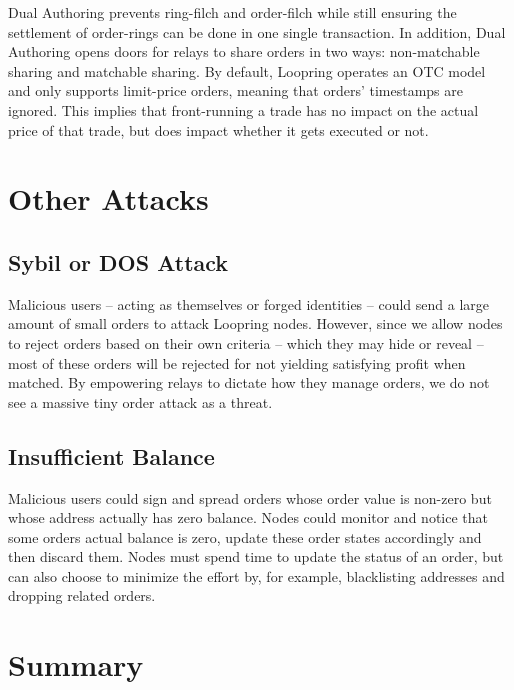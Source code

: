 \documentclass[UTF8,nofonts]{article}
\begin{document}
\begin{multicols}{2}
\begin{enumerate}
\begin{itemize}
\end{itemize}

Dual Authoring prevents ring-filch and order-filch while still ensuring the settlement of order-rings can be done in one single transaction. In addition, Dual Authoring opens doors for relays to share orders in two ways: non-matchable sharing and matchable sharing. By default, Loopring operates an OTC model and only supports limit-price orders, meaning that orders' timestamps are ignored. This implies that front-running a trade has no impact on the actual price of that trade, but does impact whether it gets executed or not.

\section{Other Attacks}

\subsection{Sybil or DOS Attack}
Malicious users -- acting as themselves or forged identities -- could send a large amount of small orders to attack Loopring nodes. However, since we allow nodes to reject orders based on their own criteria -- which they may hide or reveal -- most of these orders will be rejected for not yielding satisfying profit when matched.  By empowering relays to dictate how they manage orders, we do not see a massive tiny order attack as a threat.

\subsection{Insufficient Balance}
Malicious users could sign and spread orders whose order value is non-zero but whose address actually has zero balance. Nodes could monitor and notice that some orders actual balance is zero, update these order states accordingly and then discard them.
Nodes must spend time to update the status of an order, but can also choose to minimize the effort by, for example, blacklisting addresses and dropping related orders.

\section{Summary}


\end{enumerate}
\end{multicols}
\end{document}
